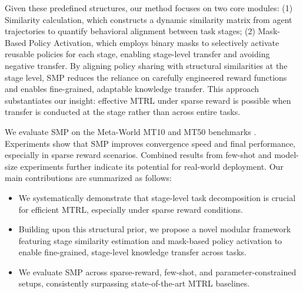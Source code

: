 \documentclass{article}
\begin{document}
Given these predefined structures, our method focuses on two core modules:
(1) Similarity calculation, which constructs a dynamic similarity matrix from agent trajectories to quantify behavioral alignment between task stages;
(2) Mask-Based Policy Activation, which employs binary masks to selectively activate reusable policies for each stage, enabling stage-level transfer and avoiding negative transfer.
By aligning policy sharing with structural similarities at the stage level, SMP reduces the reliance on carefully engineered reward functions and enables fine-grained, adaptable knowledge transfer.
This approach substantiates our insight: effective MTRL under sparse reward is possible when transfer is conducted at the stage rather than across entire tasks.

We evaluate SMP on the Meta-World MT10 and MT50 benchmarks \cite{q15}. 
Experiments show that SMP improves convergence speed and final performance, especially in sparse reward scenarios. 
Combined results from few-shot and model-size experiments further indicate its potential for real-world deployment.
Our main contributions are summarized as follows:
\begin{itemize}
\item We systematically demonstrate that stage-level task decomposition is crucial for efficient MTRL, especially under sparse reward conditions.

\item Building upon this structural prior, we propose a novel modular framework featuring stage similarity estimation and mask-based policy activation to enable fine-grained, stage-level knowledge transfer across tasks.

\item  We evaluate SMP across sparse-reward, few-shot, and parameter-constrained setups, consistently surpassing state-of-the-art MTRL baselines.
\end{itemize}
\end{document}
